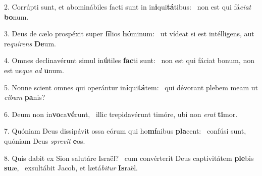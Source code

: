 2. Corrúpti sunt, et abominábiles facti sunt in in\textbf{i}qui\textbf{tá}tibus: \ast\  non est qui fá\textit{ci}\textit{at} \textbf{bo}num.\

3. Deus de cælo prospéxit super \textbf{fí}lios \textbf{hó}minum: \ast\  ut vídeat si est intélligens, aut re\textit{quí}\textit{rens} \textbf{De}um.\

4. Omnes declinavérunt simul in\textbf{ú}tiles \textbf{fac}ti sunt: \ast\  non est qui fáciat bonum, non est us\textit{que} \textit{ad} \textbf{u}num.\

5. Nonne scient omnes qui operántur in\textbf{i}qui\textbf{tá}tem: \ast\  qui dévorant plebem meam ut \textit{ci}\textit{bum} \textbf{pa}nis?\

6. Deum non in\textbf{vo}ca\textbf{vé}runt, \ast\  illic trepidavérunt timóre, ubi non \textit{e}\textit{rat} \textbf{ti}mor.\

7. Quóniam Deus dissipávit ossa eórum qui ho\textbf{mí}nibus \textbf{pla}cent: \ast\  confúsi sunt, quóniam Deus \textit{spre}\textit{vit} \textbf{e}os.\

8. Quis dabit ex Sion salutáre Israël? \dag\  cum convérterit Deus captivitátem \textbf{ple}bis \textbf{su}æ, \ast\  exsultábit Jacob, et lætá\textit{bi}\textit{tur} \textbf{Is}raël.\

